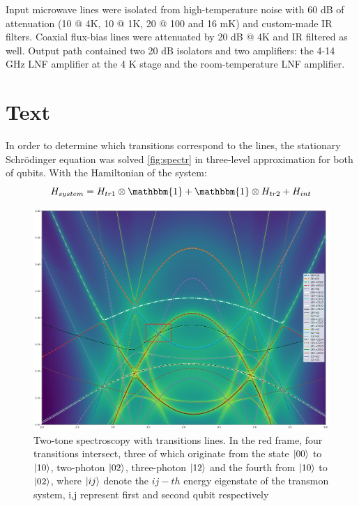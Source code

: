 \documentclass[%
 aip,
 amsmath,amssymb,
 reprint,%
]{revtex4-1}
\begin{document}
Input microwave lines were isolated from high-temperature noise with 60 dB of attenuation (10 @ 4K, 10 @ 1K, 20 @ 100 and 16 mK) and custom-made IR filters. Coaxial flux-bias lines were attenuated by 20 dB @ 4K and IR filtered as well. Output path contained two 20 dB isolators and two amplifiers: the 4-14 GHz LNF amplifier at the 4 K stage and the room-temperature LNF amplifier.



\section{Text}

In order to determine which transitions correspond to the lines, the stationary Schrödinger equation was solved \autoref{fig:spectr} in three-level approximation for both of qubits. With the Hamiltonian of the system:
\begin{equation}
	H_{system} = H_{tr1}\otimes \mathbbm{1}+\mathbbm{1}\otimes H_{tr2}+H_{int}
\end{equation}
\begin{figure}[h]
	\centering
	\includegraphics[width=\linewidth]{spectr}
	\caption{Two-tone spectroscopy with transitions lines. In the red frame, four transitions intersect, three of which originate from the state $\ket{00}$ to $\ket{10}$, two-photon
		$\ket{02}$, three-photon
		$\ket{12}$ and the fourth from  $\ket{10}$ to  $\ket{02}$, where $\ket{ij}$ denote the $ij-th$ energy eigenstate of the transmon system, i,j represent first and second qubit respectively}
	\label{fig:spectr}
\end{figure}


\end{document}
